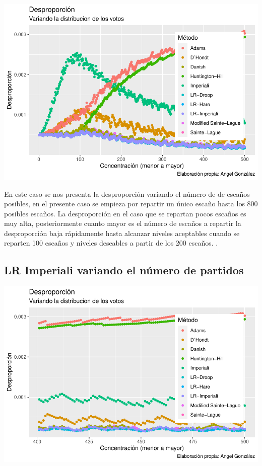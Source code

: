 \documentclass[12pt,a4paper,]{book}
\numberwithin{dummy}{section}
\theoremstyle{ocrenumbox}
\theoremstyle{blacknumex}
\theoremstyle{blacknumbox}
\theoremstyle{ocrenum}
\theoremstyle{ocrenum}
\begin{document}
\begin{center}\includegraphics[width=0.95\linewidth]{figurasR/unnamed-chunk-58-1} \end{center}

En este caso se nos presenta la desproporción variando el número de de
escaños posibles, en el presente caso se empieza por repartir un único
escaño hasta los 800 posibles escaños. La desproporción en el caso que
se repartan pocos escaños es muy alta, posteriormente cuanto mayor es el
número de escaños a repartir la desproporción baja rápidamente hasta
alcanzar niveles aceptables cuando se reparten 100 escaños y niveles
deseables a partir de los 200 escaños. .

\hypertarget{lr-imperiali-variando-el-nuxfamero-de-partidos}{%
\subsection{LR Imperiali variando el número de
partidos}\label{lr-imperiali-variando-el-nuxfamero-de-partidos}}

\begin{center}\includegraphics[width=0.95\linewidth]{figurasR/unnamed-chunk-59-1} \end{center}
\end{document}
